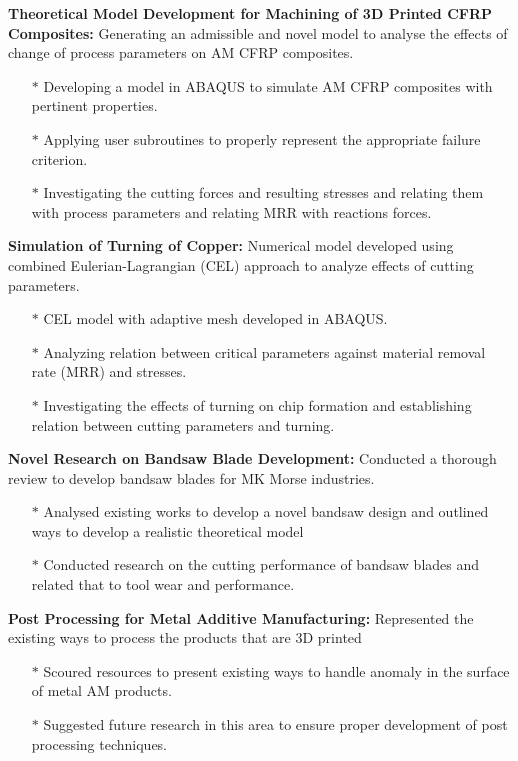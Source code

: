\documentclass[letterpaper,11pt]{article}
\newcommand{\resumeItem}[1]{
  \item\small{
    {#1 \vspace{-2pt}}
  }
}
\begin{document}
        \resumeItem{\textbf{Theoretical Model Development for Machining of 3D Printed CFRP Composites: }Generating an admissible and novel model to analyse the effects of change of process parameters on AM CFRP composites.}
         \begin{itemize}
            \item[$\ast$] Developing a model in ABAQUS to simulate AM CFRP composites with pertinent properties.
            \item[$\ast$] Applying user subroutines to properly represent the appropriate failure criterion.
            \item[$\ast$] Investigating the cutting forces and resulting stresses and relating them with process parameters and relating MRR with reactions forces.
         \end{itemize}
         
        \resumeItem{\textbf{Simulation of Turning of Copper: }Numerical model developed using combined Eulerian-Lagrangian (CEL) approach to analyze effects of cutting parameters.}
         \begin{itemize}
            \item[$\ast$] CEL model with adaptive mesh developed in ABAQUS. 
            \item[$\ast$] Analyzing relation between critical parameters against material removal rate (MRR) and stresses.
            \item[$\ast$] Investigating the effects of turning on chip formation and establishing relation between cutting parameters and turning.
         \end{itemize}         
         
        \resumeItem{\textbf{Novel Research on Bandsaw Blade Development: }Conducted a thorough review to develop bandsaw blades for MK Morse industries.}
         \begin{itemize}
            \item[$\ast$] Analysed existing works to develop a novel bandsaw design and outlined ways to develop a realistic theoretical model
            \item[$\ast$] Conducted research on the cutting performance of bandsaw blades and related that to tool wear and performance.
         \end{itemize}
         
        \resumeItem{\textbf{Post Processing for Metal Additive Manufacturing: }Represented the existing ways to process the products that are 3D printed}
         \begin{itemize}
            \item[$\ast$] Scoured resources to present existing ways to handle anomaly in the surface of metal AM products. 
            \item[$\ast$] Suggested future research in this area to ensure proper development of post processing techniques.
         \end{itemize}
\end{document}
